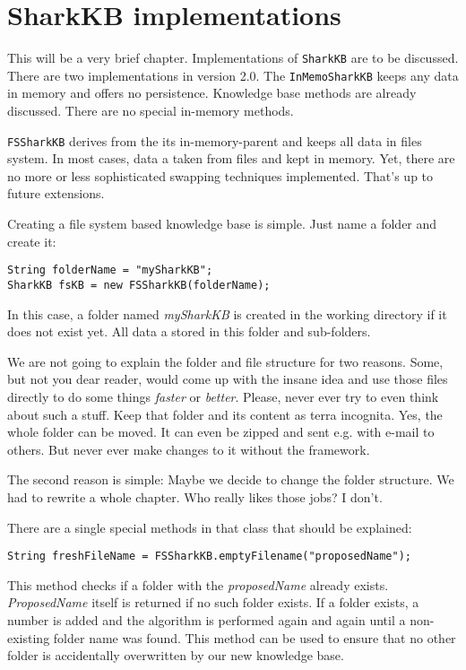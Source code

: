 \chapter{SharkKB implementations}
\label{sec:sharkkbimplementations}
This will be a very brief chapter. Implementations of {\tt SharkKB} are to be discussed. There are two implementations in version 2.0. The {\tt InMemoSharkKB} keeps any data in memory and offers no persistence. Knowledge base methods are already discussed. There are no special in-memory methods.

{\tt FSSharkKB} derives from the its in-memory-parent and keeps all data in files system. In most cases, data a taken from files and kept in memory. Yet, there are no more or less sophisticated swapping techniques implemented. That's up to future extensions.

Creating a file system based knowledge base is simple. Just name a folder and create it:

\begin{verbatim}
String folderName = "mySharkKB";
SharkKB fsKB = new FSSharkKB(folderName);
\end{verbatim}

In this case, a folder named {\it mySharkKB} is created in the working directory if it does not exist yet. All data a stored in this folder and sub-folders. 

We are not going to explain the folder and file structure for two reasons. Some, but not you dear reader, would come up with the insane idea and use those files directly to do some things {\it faster} or {\it better}. Please, never ever try to even think about such a stuff. Keep that folder and its content as terra incognita. Yes, the whole folder can be moved. It can even be zipped and sent e.g. with e-mail to others. But never ever make changes to it without the framework.

The second reason is simple: Maybe we decide to change the folder structure. We had to rewrite a whole chapter. Who really likes those jobs? I don't.

There are a single special methods in that class that should be explained:

\begin{verbatim}
String freshFileName = FSSharkKB.emptyFilename("proposedName");
\end{verbatim}

This method checks if a folder with the {\it proposedName} already exists. {\it ProposedName} itself is returned if no such folder exists. If a folder exists, a number is added and the algorithm is performed again and again until a non-existing folder name was found. This method can be used to ensure that no other folder is accidentally overwritten by our new knowledge base.
